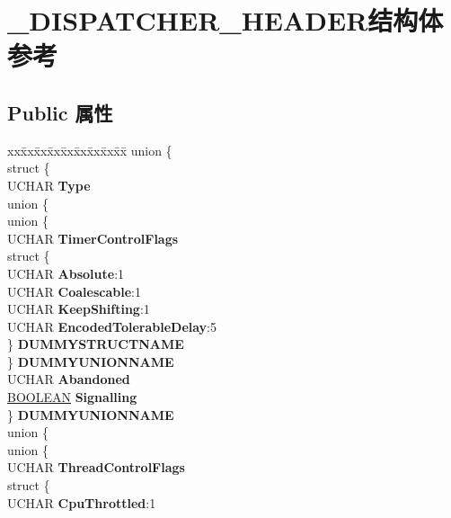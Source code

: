 \hypertarget{struct___d_i_s_p_a_t_c_h_e_r___h_e_a_d_e_r}{}\section{\+\_\+\+D\+I\+S\+P\+A\+T\+C\+H\+E\+R\+\_\+\+H\+E\+A\+D\+E\+R结构体 参考}
\label{struct___d_i_s_p_a_t_c_h_e_r___h_e_a_d_e_r}
\subsection*{Public 属性}
\begin{DoxyCompactItemize}
\item 
\mbox{\label{struct___d_i_s_p_a_t_c_h_e_r___h_e_a_d_e_r_a6e58510b2bf2f3d384b9c484643ef7c5}} 
\begin{tabbing}
xx\=xx\=xx\=xx\=xx\=xx\=xx\=xx\=xx\=\kill
union \{\\
\>struct \{\\
\>\>UCHAR {\bfseries Type}\\
\>\>union \{\\
\>\>\>union \{\\
\>\>\>\>UCHAR {\bfseries TimerControlFlags}\\
\>\>\>\>struct \{\\
\>\>\>\>\>UCHAR {\bfseries Absolute}:1\\
\>\>\>\>\>UCHAR {\bfseries Coalescable}:1\\
\>\>\>\>\>UCHAR {\bfseries KeepShifting}:1\\
\>\>\>\>\>UCHAR {\bfseries EncodedTolerableDelay}:5\\
\>\>\>\>\} {\bfseries DUMMYSTRUCTNAME}\\
\>\>\>\} {\bfseries DUMMYUNIONNAME}\\
\>\>\>UCHAR {\bfseries Abandoned}\\
\>\>\>\hyperlink{_processor_bind_8h_a112e3146cb38b6ee95e64d85842e380a}{BOOLEAN} {\bfseries Signalling}\\
\>\>\} {\bfseries DUMMYUNIONNAME}\\
\>\>union \{\\
\>\>\>union \{\\
\>\>\>\>UCHAR {\bfseries ThreadControlFlags}\\
\>\>\>\>struct \{\\
\>\>\>\>\>UCHAR {\bfseries CpuThrottled}:1\\

\end{tabbing}
\end{DoxyCompactItemize}
